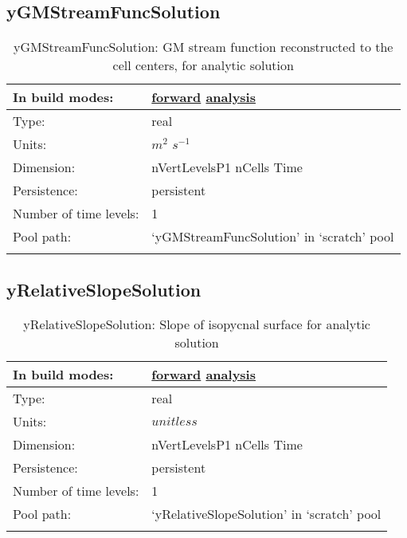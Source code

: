 \subsection[yGMStreamFuncSolution]{yGMStreamFuncSolution}
\label{subsec:var_sec_scratch_yGMStreamFuncSolution}
\begin{center}
\begin{longtable}{| p{2.0in} | p{4.0in} |}
        \hline 
        In build modes: & \hyperref[subsec:forward_var_tab_scratch]{forward} \hyperref[subsec:analysis_var_tab_scratch]{analysis} \\
        \hline 
        Type: & real \\
        \hline 
        Units: & $m^2$ $s^{-1}$ \\
        \hline 
        Dimension: & nVertLevelsP1 nCells Time \\
        \hline 
        Persistence: & persistent \\
        \hline 
        Number of time levels: & 1 \\
        \hline 
            Pool path: & `yGMStreamFuncSolution' in `scratch' pool \\
		 \hline 
    \caption{yGMStreamFuncSolution: GM stream function reconstructed to the cell centers, for analytic solution}
\end{longtable}
\end{center}
\subsection[yRelativeSlopeSolution]{yRelativeSlopeSolution}
\label{subsec:var_sec_scratch_yRelativeSlopeSolution}
\begin{center}
\begin{longtable}{| p{2.0in} | p{4.0in} |}
        \hline 
        In build modes: & \hyperref[subsec:forward_var_tab_scratch]{forward} \hyperref[subsec:analysis_var_tab_scratch]{analysis} \\
        \hline 
        Type: & real \\
        \hline 
        Units: & $unitless$ \\
        \hline 
        Dimension: & nVertLevelsP1 nCells Time \\
        \hline 
        Persistence: & persistent \\
        \hline 
        Number of time levels: & 1 \\
        \hline 
            Pool path: & `yRelativeSlopeSolution' in `scratch' pool \\
		 \hline 
    \caption{yRelativeSlopeSolution: Slope of isopycnal surface for analytic solution}
\end{longtable}
\end{center}
